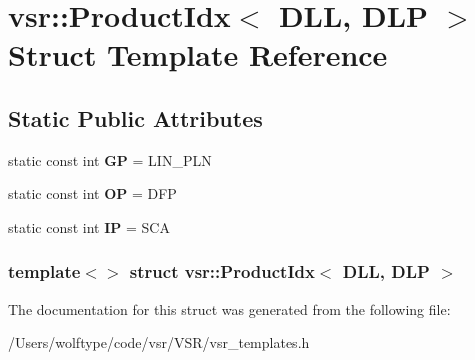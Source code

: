 \hypertarget{structvsr_1_1_product_idx_3_01_d_l_l_00_01_d_l_p_01_4}{\section{vsr\-:\-:Product\-Idx$<$ D\-L\-L, D\-L\-P $>$ Struct Template Reference}
\label{structvsr_1_1_product_idx_3_01_d_l_l_00_01_d_l_p_01_4}
}
\subsection*{Static Public Attributes}
\begin{DoxyCompactItemize}
\item 
\hypertarget{structvsr_1_1_product_idx_3_01_d_l_l_00_01_d_l_p_01_4_a111d9ddb5e1ca852e430194b33338981}{static const int {\bfseries G\-P} = L\-I\-N\-\_\-\-P\-L\-N}\label{structvsr_1_1_product_idx_3_01_d_l_l_00_01_d_l_p_01_4_a111d9ddb5e1ca852e430194b33338981}

\item 
\hypertarget{structvsr_1_1_product_idx_3_01_d_l_l_00_01_d_l_p_01_4_a27a06504d4adb5748108af79022b2a16}{static const int {\bfseries O\-P} = D\-F\-P}\label{structvsr_1_1_product_idx_3_01_d_l_l_00_01_d_l_p_01_4_a27a06504d4adb5748108af79022b2a16}

\item 
\hypertarget{structvsr_1_1_product_idx_3_01_d_l_l_00_01_d_l_p_01_4_a59193c2f59ef70e7866c3821f787d060}{static const int {\bfseries I\-P} = S\-C\-A}\label{structvsr_1_1_product_idx_3_01_d_l_l_00_01_d_l_p_01_4_a59193c2f59ef70e7866c3821f787d060}

\end{DoxyCompactItemize}
\subsubsection*{template$<$$>$ struct vsr\-::\-Product\-Idx$<$ D\-L\-L, D\-L\-P $>$}



The documentation for this struct was generated from the following file\-:\begin{DoxyCompactItemize}
\item 
/\-Users/wolftype/code/vsr/\-V\-S\-R/vsr\-\_\-templates.\-h\end{DoxyCompactItemize}
